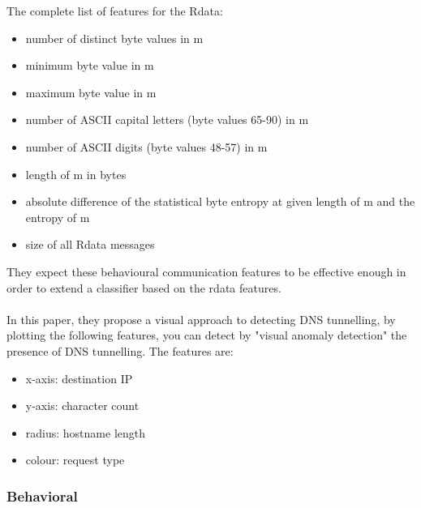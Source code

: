 The complete list of features for the Rdata:
\begin{itemize}[noitemsep]
\item number of distinct byte values in m
\item minimum byte value in m
\item maximum byte value in m
\item number of ASCII capital letters (byte values 65-90) in m
\item number of ASCII digits (byte values 48-57) in m
\item length of m in bytes
\item absolute difference of the statistical byte entropy at given length of m and the entropy of m
\item size of all Rdata messages
\end{itemize}
They expect these behavioural communication features to be effective enough in order to extend a classifier based on the rdata features.
\\\\
In this paper\cite{tunn}, they propose a visual approach to detecting DNS tunnelling, by plotting the following features, you can detect by "visual anomaly detection" the presence of DNS tunnelling. The features are:
\begin{itemize}[noitemsep]
\item x-axis: destination IP
\item y-axis: character count
\item radius: hostname length
\item colour: request type
\end{itemize}



\subsubsection{Behavioral}




